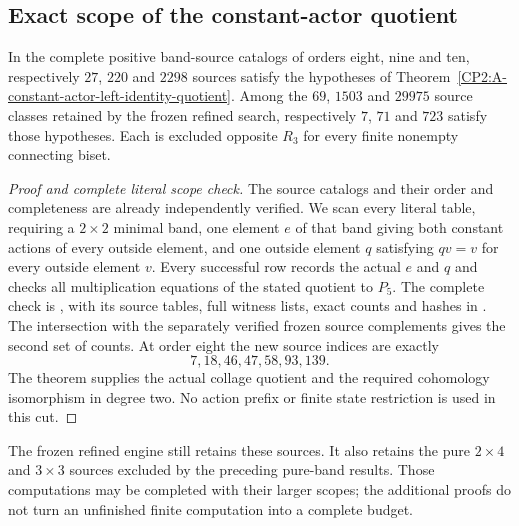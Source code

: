 \subsection{Exact scope of the constant-actor quotient}

\begin{proposition}
\label{CP2:A-constant-actor-source-scope}
In the complete positive band-source catalogs of orders eight, nine
and ten, respectively $27$, $220$ and $2298$ sources satisfy the
hypotheses of Theorem~\ref{CP2:A-constant-actor-left-identity-quotient}.
Among the $69$, $1503$ and $29975$ source classes retained by the
frozen refined search, respectively $7$, $71$ and $723$ satisfy those
hypotheses. Each is excluded opposite $R_3$ for every finite nonempty
connecting biset.
\end{proposition}
\begin{proof}[Proof and complete literal scope check]
The source catalogs and their order and completeness are already
independently verified. We scan every literal table, requiring a
$2\times2$ minimal band, one element $e$ of that band giving both
constant actions of every outside element, and one outside element
$q$ satisfying $qv=v$ for every outside element $v$.
Every successful row records the actual $e$ and $q$ and checks
all multiplication equations of the stated quotient to $P_5$.
The complete check is
, with its
source tables, full witness lists, exact counts and hashes in
.
The intersection with the separately verified frozen source
complements gives the second set of counts. At order eight the
new source indices are exactly
\[
 7,18,46,47,58,93,139.
\]
The theorem supplies the actual collage quotient and the required
cohomology isomorphism in degree two. No action prefix or finite
state restriction is used in this cut.
\end{proof}

\begin{remark*}
The frozen refined engine still retains these sources. It also
retains the pure $2\times4$ and $3\times3$ sources excluded by the
preceding pure-band results. Those computations may be completed
with their larger scopes; the additional proofs do not turn an
unfinished finite computation into a complete budget.
\end{remark*}
